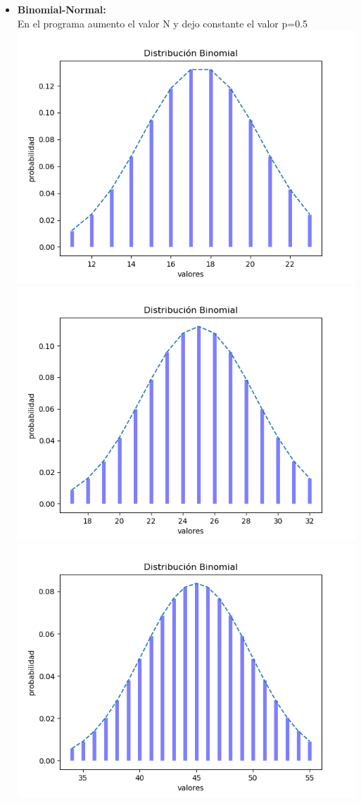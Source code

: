 \documentclass[12pt,a4paper]{article}
\begin{document}
\begin{multicols}{2}
\begin{itemize}
    \end{itemize}
    \begin{itemize}
        \item \textbf{Binomial-Normal:}\\
        En el programa aumento el valor N y dejo constante el valor p=0.5\\
        \includegraphics[scale=0.5]{binomial_normal_1.png}
        \includegraphics[scale=0.5]{binomial_normal_2.png}
        \includegraphics[scale=0.5]{binomial_normal_3.png}

\end{itemize}
\end{multicols}
\end{document}
